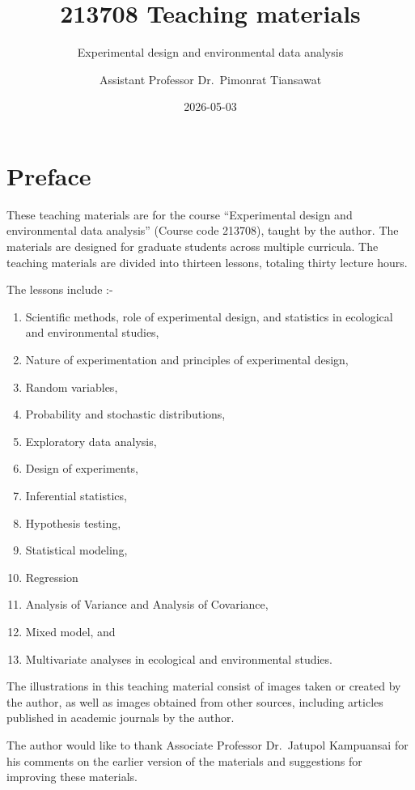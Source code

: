 \documentclass[
]{book}
\title{213708 Teaching materials}
\subtitle{Experimental design and environmental data analysis}
\author{Assistant Professor Dr.~Pimonrat Tiansawat}
\date{2026-05-03}
\providecommand{\tightlist}{%
  \setlength{\itemsep}{0pt}\setlength{\parskip}{0pt}}
\begin{document}
\maketitle

{
\setcounter{tocdepth}{1}
\tableofcontents
}
\chapter*{Preface}\label{preface}

These teaching materials are for the course ``Experimental design and environmental data analysis'' (Course code 213708), taught by the author. The materials are designed for graduate students across multiple curricula. The teaching materials are divided into thirteen lessons, totaling thirty lecture hours.

The lessons include :-

\begin{enumerate}
\def\labelenumi{\arabic{enumi}.}
\tightlist
\item
  Scientific methods, role of experimental design, and statistics in ecological and environmental studies,
\item
  Nature of experimentation and principles of experimental design,
\item
  Random variables,\\
\item
  Probability and stochastic distributions,
\item
  Exploratory data analysis,
\item
  Design of experiments,
\item
  Inferential statistics,
\item
  Hypothesis testing,
\item
  Statistical modeling,
\item
  Regression
\item
  Analysis of Variance and Analysis of Covariance,\\
\item
  Mixed model, and
\item
  Multivariate analyses in ecological and environmental studies.
\end{enumerate}

The illustrations in this teaching material consist of images taken or created by the author, as well as images obtained from other sources, including articles published in academic journals by the author.

The author would like to thank Associate Professor Dr.~Jatupol Kampuansai for his comments on the earlier version of the materials and suggestions for improving these materials.
\end{document}
